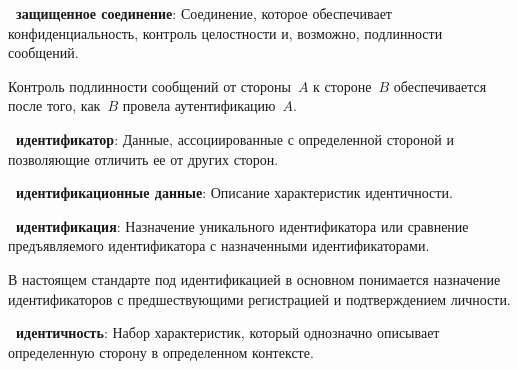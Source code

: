 {\bf \thedefctr~защищенное соединение}: %
Соединение, которое обеспечивает конфиденциальность, 
контроль целостности и, возможно, подлинности сообщений. 

\begin{note*}
Контроль подлинности сообщений от стороны~$A$ к стороне~$B$ 
обеспечивается после того, как~$B$ провела аутентификацию~$A$.
\end{note*}

{\bf \thedefctr~идентификатор}:
Данные, ассоциированные с определенной стороной и позволяющие 
отличить ее от других сторон.





{\bf \thedefctr~идентификационные данные}:
Описание характеристик идентичности. 

{\bf \thedefctr~идентификация}: %
Назначение уникального идентификатора или сравнение предъявляемого 
идентификатора с назначенными идентификаторами.

\begin{note*}
В настоящем стандарте под идентификацией в основном понимается назначение
идентификаторов с предшествующими регистрацией и подтверждением личности.
\end{note*}

{\bf \thedefctr~идентичность}:
Набор характеристик, который однозначно описывает определенную сторону в 
определенном контексте.





